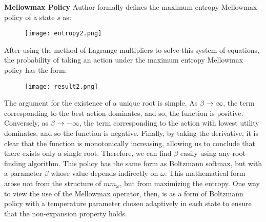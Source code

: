 \textbf{Mellowmax Policy}
\newline\newline
Author formally defines the maximum entropy Mellowmax policy of a state $s$ as:

\begin{figure}[htbp]
\centering
\texttt{[image: entropy2.png]}
\end{figure}

After using the method of Lagrange multipliers to solve this system of equations, the probability of taking an action under the maximum entropy Mellowmax policy has the form:

\begin{figure}[htbp]
\centering
\texttt{[image: result2.png]}
\end{figure}

The argument for the existence of a unique root is simple. As $\beta$ → $\infty$, the term corresponding to the best action dominates, and so, the function is positive. Conversely, as $\beta$ → $-\infty$, the term corresponding to the action with lowest utility dominates, and so the function is negative. Finally, by taking the derivative, it is clear that the function is monotonically increasing, allowing us to conclude that there exists only a single root. Therefore, we can find $\beta$ easily using any root-finding algorithm. 
\newline\newline
This policy has the same form as Boltzmann softmax, but with a parameter $\beta$ whose value depends indirectly on $\omega$. This mathematical form arose not from the structure of $mm_\omega$, but from maximizing the entropy. One way to view the use of the Mellowmax operator, then, is as a form of Boltzmann policy with a temperature parameter chosen adaptively in each state to ensure that the non-expansion property holds.
